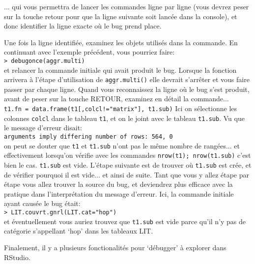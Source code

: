 \documentclass{article}
\begin{document}
... qui vous permettra de lancer les commandes ligne par ligne (vous
devrez peser sur la touche retour pour que la ligne suivante soit
lancée dans la console), et donc identifier la ligne exacte où le bug
prend place.

Une fois la ligne identifiée, examinez les objets utilisés dans la
commande. En continuant avec l'exemple précédent, vous pourriez
faire:\\
\texttt{> debugonce(aggr.multi)}\\
et relancer la commande initiale qui avait produit le bug. Lorsque la
fonction arrivera à l'étape d'utilisation de \texttt{aggr.multi()}
elle devrait s'arrêter et vous faire passer par chaque ligne. Quand
vous reconnaissez la ligne où le bug s'est produit, avant de peser sur
la touche RETOUR, examinez en détail la commande...
\texttt{ t1.fn = data.frame(t1[,colcl!="matrix"], t1.sub)}
Ici on sélectionne les colonnes \texttt{colcl} dans le tableau
\texttt{t1}, et on le joint avec le tableau \texttt{t1.sub}. Vu que le
message d'erreur disait:\\
\texttt{arguments imply differing number of rows: 564, 0}\\
on peut se douter que \texttt{t1} et \texttt{t1.sub} n'ont pas le même
nombre de rangées... et effectivement lorsqu'on vérifie avec les
commandes \texttt{nrow(t1); nrow(t1.sub)} c'est bien le
cas. \texttt{t1.sub} est vide. L'étape suivante est de trouver où
\texttt{t1.sub} est crée, et de vérifier pourquoi il est vide... et
ainsi de suite. Tant que vous y allez étape par étape vous allez
trouver la source du bug, et deviendrez plus efficace avec la pratique
dans l'interprétation du message d'erreur. Ici, la commande initiale
ayant causée le bug était: \\
\texttt{> LIT.couvrt.gnrl(LIT.cat="hop")}\\
et éventuellement vous auriez trouvez que \texttt{t1.sub} est vide
parce qu'il n'y pas de catégorie s'appellant `hop' dans les tableaux LIT.

Finalement, il y a plusieurs fonctionalités pour `débugger' à explorer
dans RStudio.

\begin{comment}
\section{Informations supplémentaires}
\subsection{Fichiers de code R requis}


\end{comment}
\end{document}
